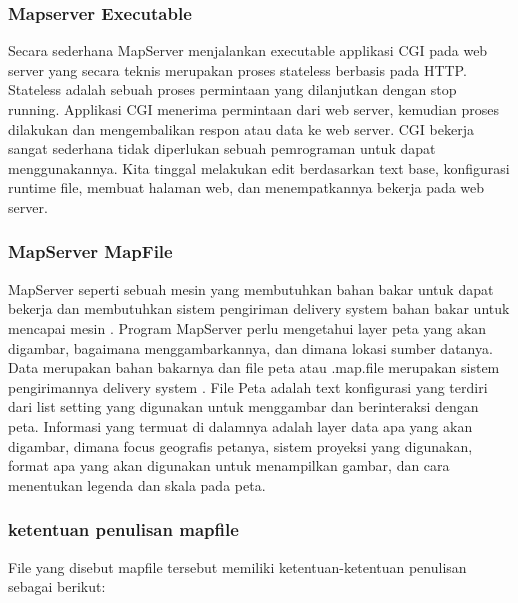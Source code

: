 	\subsubsection{Mapserver Executable}
		Secara sederhana MapServer menjalankan executable applikasi CGI pada web server yang secara teknis merupakan proses
 		stateless berbasis pada HTTP. Stateless adalah sebuah proses permintaan yang dilanjutkan dengan stop running. Applikasi CGI 		
		menerima permintaan dari web server, kemudian proses dilakukan dan mengembalikan respon atau data ke web server. CGI bekerja 		
		sangat sederhana tidak diperlukan sebuah pemrograman untuk dapat menggunakannya. Kita tinggal melakukan edit berdasarkan text base,
		konfigurasi runtime file, membuat halaman web, dan menempatkannya bekerja pada web server.
		
	\subsubsection{MapServer MapFile}		MapServer seperti sebuah mesin yang membutuhkan bahan bakar untuk dapat bekerja dan membutuhkan sistem pengiriman  delivery system  bahan bakar untuk mencapai mesin . 
		Program MapServer perlu mengetahui layer peta yang akan digambar, bagaimana menggambarkannya, dan dimana lokasi sumber datanya. 
		Data merupakan bahan bakarnya dan file peta atau .map.file merupakan sistem pengirimannya  delivery system . 
		File Peta adalah text konfigurasi yang terdiri dari list setting yang digunakan untuk menggambar dan berinteraksi dengan peta. 
		Informasi yang termuat di dalamnya adalah layer data apa yang akan digambar, dimana focus geografis petanya, sistem proyeksi yang digunakan, 
		format apa yang akan digunakan untuk menampilkan gambar, dan cara menentukan legenda dan skala pada peta.
		
	\subsubsection{ketentuan penulisan mapfile}
		File yang disebut mapfile tersebut memiliki ketentuan-ketentuan penulisan sebagai berikut:

